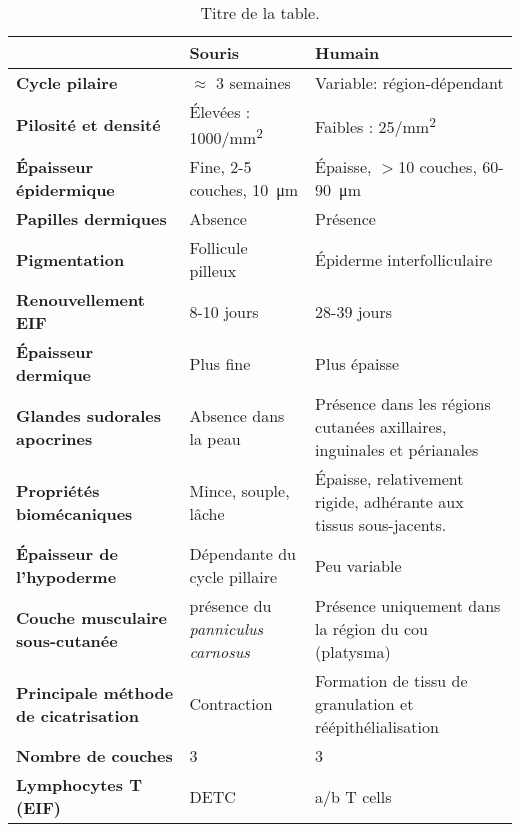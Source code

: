 \begin{table}[ht]%
\footnotesize
    \caption{Titre de la table.}
    \begin{tabularx}{1\textwidth}{
     >{\raggedright\arraybackslash}X 
     >{\raggedright\arraybackslash}X 
     >{\raggedright\arraybackslash}X  }  \hline \hline
        \textbf{ }                      & \textbf{Souris}                       & \textbf{Humain} \\ \hline
        \textbf{Cycle pilaire}          & $\approx$ \num{3} semaines            & Variable: région-dépendant \\ 
        \textbf{Pilosité et densité}   & Élevées : \num{1000}/\unit{\square\milli\metre}                  & Faibles : \num{25}/\unit{\square\milli\metre} \\ 
        \textbf{Épaisseur épidermique}  & Fine, \num{2}-\num{5} couches, \SI{10}{\micro\metre}           & Épaisse, $>$\num{10} couches, \num{60}-\SI{90}{\micro\metre}  \\ 
        \textbf{Papilles dermiques}     & Absence                               & Présence \\ 
        \textbf{Pigmentation}           & Follicule pilleux                     & Épiderme interfolliculaire \\ 
        \textbf{Renouvellement EIF} & \num{8}-\num{10} jours                         & \num{28}-\num{39} jours \\ 
        \textbf{Épaisseur dermique}     & Plus fine                              & Plus épaisse \\ 
        \textbf{Glandes sudorales apocrines} & Absence dans la peau             & Présence dans les régions cutanées axillaires, inguinales et périanales \\ 
        \textbf{Propriétés biomécaniques } & Mince, souple, lâche               & Épaisse, relativement rigide, adhérante aux tissus sous-jacents. \\ 
        \textbf{Épaisseur de l'hypoderme} & Dépendante du cycle pillaire         & Peu variable  \\ 
        \textbf{Couche musculaire sous-cutanée} & présence du \textit{panniculus carnosus}  & Présence uniquement dans la région du cou (platysma) \\
        \textbf{Principale méthode de cicatrisation} & Contraction              & Formation de tissu de granulation et réépithélialisation \\ 
        \textbf{Nombre de couches}      & \num{3}                                     & \num{3} \\ 
        \textbf{Lymphocytes T (EIF)}          & DETC                  & a/b T cells \\ \hline \hline
    \end{tabularx}
    \label{table:diff-souris-hum}
\end{table}

